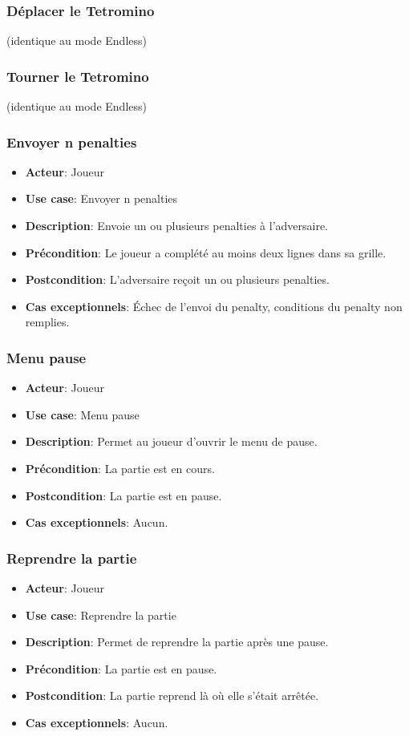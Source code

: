 \documentclass{article}
\begin{document}
\subsubsection*{Déplacer le Tetromino} (identique au mode Endless)

\subsubsection*{Tourner le Tetromino} (identique au mode Endless)

\subsubsection*{Envoyer n penalties}
\begin{itemize}
    \item \textbf{Acteur}: Joueur
    \item \textbf{Use case}: Envoyer n penalties
    \item \textbf{Description}: Envoie un ou plusieurs penalties à l'adversaire.
    \item \textbf{Précondition}: Le joueur a complété au moins deux lignes dans sa grille.
    \item \textbf{Postcondition}: L'adversaire reçoit un ou plusieurs penalties.
    \item \textbf{Cas exceptionnels}: Échec de l’envoi du penalty, conditions du penalty non remplies.
\end{itemize}

\subsubsection*{Menu pause}
\begin{itemize}
    \item \textbf{Acteur}: Joueur
    \item \textbf{Use case}: Menu pause
    \item \textbf{Description}: Permet au joueur d'ouvrir le menu de pause.
    \item \textbf{Précondition}: La partie est en cours.
    \item \textbf{Postcondition}: La partie est en pause.
    \item \textbf{Cas exceptionnels}: Aucun.
\end{itemize}

\subsubsection*{Reprendre la partie}
\begin{itemize}
    \item \textbf{Acteur}: Joueur
    \item \textbf{Use case}: Reprendre la partie
    \item \textbf{Description}: Permet de reprendre la partie après une pause.
    \item \textbf{Précondition}: La partie est en pause.
    \item \textbf{Postcondition}: La partie reprend là où elle s'était arrêtée.
    \item \textbf{Cas exceptionnels}: Aucun.
\end{itemize}
\end{document}
